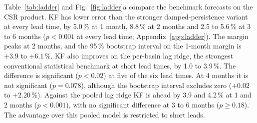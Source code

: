 \documentclass[hess, manuscript]{copernicus}
\begin{document}
Table~\ref{tab:ladder} and Fig.~\ref{fig:ladder}a compare the benchmark
forecasts on the CSR product. KF has lower error than the stronger
damped-persistence variant at every lead time, by
5.0\,\% at 1 month, 8.8\,\% at 2 months and 2.5 to 5.6\,\% at 3 to 6
months
($p < 0.001$ at every lead time; Appendix~\ref{app:ladder}). The margin
peaks at 2 months, and the 95\,\% bootstrap interval on the 1-month margin
is
$+3.9$ to $+6.1\,\%$. KF also improves on the per-basin lag ridge, the strongest
conventional statistical benchmark at short lead times, by
1.0 to 3.9\,\%. The difference is significant ($p < 0.02$) at five of the
six lead times. At 4 months it is not significant ($p = 0.078$), although the
bootstrap interval excludes zero
($+0.02$ to $+2.20\,\%$). Against the pooled lag ridge KF is ahead by
3.9 and 4.2\,\% at 1 and 2 months ($p < 0.001$), with no significant
difference at 3 to 6 months ($p \ge 0.18$). The advantage over this
pooled model is restricted to short leads.
\end{document}
